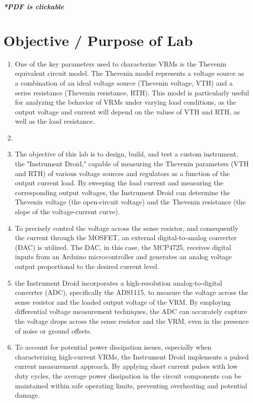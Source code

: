 \documentclass[a4paper,11pt]{article}%
\begin{document}


\pagebreak

\tableofcontents
\listoffigures
\listoftables
\vfill
\begin{center}
	\textbf{\textit{*PDF is clickable}}
\end{center}

\pagebreak

\section{Objective / Purpose of Lab}
\begin{enumerate}
	\item One of the key parameters used to characterize VRMs is the Thevenin equivalent circuit model. The Thevenin model represents a voltage source as a combination of an ideal voltage source (Thevenin voltage, VTH) and a series resistance (Thevenin resistance, RTH). This model is particularly useful for analyzing the behavior of VRMs under varying load conditions, as the output voltage and current will depend on the values of VTH and RTH, as well as the load resistance.
	\item 
	\item The objective of this lab is to design, build, and test a custom instrument, the "Instrument Droid," capable of measuring the Thevenin parameters (VTH and RTH) of various voltage sources and regulators as a function of the output current load. By sweeping the load current and measuring the corresponding output voltages, the Instrument Droid can determine the Thevenin voltage (the open-circuit voltage) and the Thevenin resistance (the slope of the voltage-current curve).

	\item To precisely control the voltage across the sense resistor, and consequently the current through the MOSFET, an external digital-to-analog converter (DAC) is utilized. The DAC, in this case, the MCP4725, receives digital inputs from an Arduino microcontroller and generates an analog voltage output proportional to the desired current level.

	\item the Instrument Droid incorporates a high-resolution analog-to-digital converter (ADC), specifically the ADS1115, to measure the voltage across the sense resistor and the loaded output voltage of the VRM. By employing differential voltage measurement techniques, the ADC can accurately capture the voltage drops across the sense resistor and the VRM, even in the presence of noise or ground offsets.

	\item To account for potential power dissipation issues, especially when characterizing high-current VRMs, the Instrument Droid implements a pulsed current measurement approach. By applying short current pulses with low duty cycles, the average power dissipation in the circuit components can be maintained within safe operating limits, preventing overheating and potential damage.
\end{enumerate}
\end{document}
